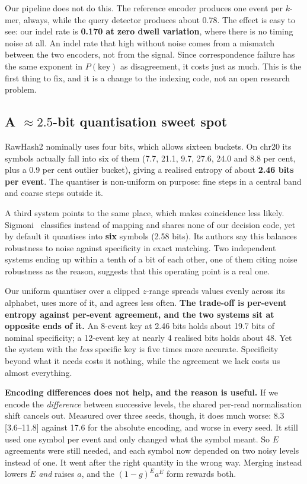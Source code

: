 \documentclass[conference]{IEEEtran}
\begin{document}
Our pipeline does not do this. The reference encoder produces one event per $k$-mer, always,
while the query detector produces about 0.78. The effect is easy to see: our indel rate is
\textbf{0.170 at zero dwell variation}, where there is no timing noise at all. An indel rate that
high without noise comes from a mismatch between the two encoders, not from the signal. Since
correspondence failure has the same exponent in $P(\mathrm{key})$ as disagreement, it costs just
as much. This is the first thing to fix, and it is a change to the indexing code, not an open
research problem.

\subsection{A ${\approx}2.5$-bit quantisation sweet spot}

RawHash2 nominally uses four bits, which allows sixteen buckets. On chr20 its symbols actually
fall into six of them (7.7, 21.1, 9.7, 27.6, 24.0 and 8.8 per cent, plus a 0.9 per cent outlier
bucket), giving a realised entropy of about \textbf{2.46 bits per event}. The quantiser is
non-uniform on purpose: fine steps in a central band and coarse steps outside it.

A third system points to the same place, which makes coincidence less likely.
Sigmoni~\cite{sigmoni} classifies instead of mapping and shares none of our decision code, yet
by default it quantises into \textbf{six} symbols (2.58 bits). Its authors say this balances
robustness to noise against specificity in exact matching. Two independent systems ending up
within a tenth of a bit of each other, one of them citing noise robustness as the reason,
suggests that this operating point is a real one.

Our uniform quantiser over a clipped $z$-range spreads values evenly across its alphabet, uses
more of it, and agrees less often. \textbf{The trade-off is per-event entropy against per-event
agreement, and the two systems sit at opposite ends of it.} An 8-event key at 2.46 bits holds
about 19.7 bits of nominal specificity; a 12-event key at nearly 4 realised bits holds about 48.
Yet the system with the \emph{less} specific key is five times more accurate. Specificity beyond
what it needs costs it nothing, while the agreement we lack costs us almost everything.

\textbf{Encoding differences does not help, and the reason is useful.} If we encode the
\emph{difference} between successive levels, the shared per-read normalisation shift cancels
out. Measured over three seeds, though, it does much worse: 8.3 [3.6--11.8] against 17.6 for the
absolute encoding, and worse in every seed. It still used one symbol per event and only changed
what the symbol meant. So $E$ agreements were still needed, and each symbol now depended on two
noisy levels instead of one. It went after the right quantity in the wrong way. Merging instead
lowers $E$ \emph{and} raises $a$, and the $(1-g)^{E} a^{E}$ form rewards both.
\end{document}
